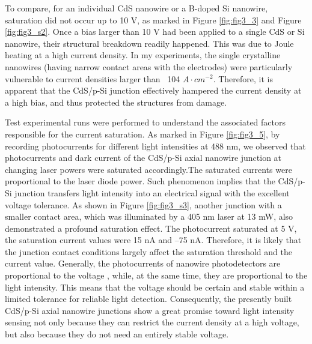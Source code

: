To compare, for an individual  CdS nanowire or a B-doped Si nanowire, saturation did not occur up to 10 V, as marked in Figure \ref{fig:fig3_3} and Figure \ref{fig:fig3_s2}. Once a bias larger than 10 V had been applied to a single CdS or Si nanowire, their structural breakdown readily happened. This was due to Joule heating at a high current density. \cite{Wu2004} In my experiments, the single crystalline nanowires (having narrow contact areas with the electrodes) were particularly vulnerable to current densities larger than ~104 $A\cdot cm^{-2}$. Therefore, it is apparent that the CdS/p-Si junction effectively hampered the current density at a high bias, and thus protected the structures from damage. 


Test experimental runs were performed to understand the associated factors responsible for the current saturation. As marked in Figure \ref{fig:fig3_5}, by recording  photocurrents for different light intensities at 488 nm, we observed that photocurrents and dark current of the CdS/p-Si axial nanowire junction at changing laser powers were saturated accordingly.The saturated currents were proportional to the laser diode power. Such phenomenon implies that the CdS/p-Si junction transfers light intensity into an electrical signal with the excellent voltage tolerance. As shown in Figure \ref{fig:fig3_s3}, another junction with a smaller contact area, which was illuminated by a 405 nm laser at 13 mW, also demonstrated a profound saturation effect. The photocurrent saturated at 5 V, the saturation current values were 15 nA and –75 nA. Therefore, it is likely that the junction contact conditions largely affect the saturation threshold and the current value. Generally, the photocurrents of nanowire photodetectors are proportional to the voltage \cite{577926470}, while, at the same time, they are proportional to the light intensity. This means that the voltage should be certain and stable within a limited tolerance for reliable light detection. Consequently, the presently built CdS/p-Si axial nanowire junctions show a great promise toward light intensity sensing not only because they can restrict the current density at a high voltage, but also because they do not need an entirely stable voltage. 

